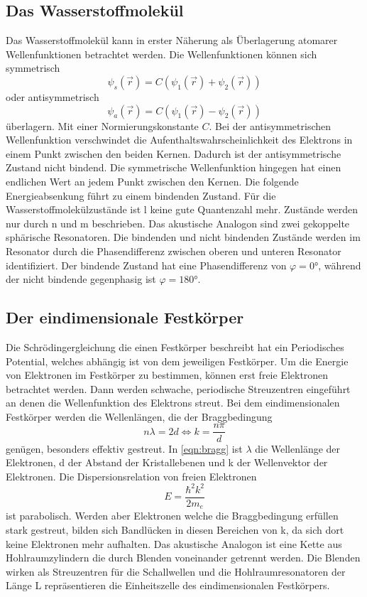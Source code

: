 \subsection{Das Wasserstoffmolekül}
Das Wasserstoffmolekül kann in erster Näherung als Überlagerung atomarer Wellenfunktionen betrachtet werden.
Die Wellenfunktionen können sich symmetrisch
\begin{equation}
    \psi_s(\vec{r}) = C(\psi_1(\vec{r})+\psi_2(\vec{r}))
\end{equation}
oder antisymmetrisch
\begin{equation}
    \psi_a(\vec{r}) = C(\psi_1(\vec{r})-\psi_2(\vec{r}))
\end{equation}
überlagern. Mit einer Normierungskonstante $C$. Bei der antisymmetrischen Wellenfunktion verschwindet die Aufenthaltswahrscheinlichkeit des Elektrons
in einem Punkt zwischen den beiden Kernen. Dadurch ist der antisymmetrische Zustand nicht bindend. 
Die symmetrische Wellenfunktion hingegen hat einen endlichen Wert an jedem Punkt zwischen den Kernen. Die folgende Energieabsenkung führt zu einem bindenden Zustand.
Für die Wasserstoffmolekülzustände ist l keine gute Quantenzahl mehr. Zustände werden nur durch n und m beschrieben.
Das akustische Analogon sind zwei gekoppelte sphärische Resonatoren. Die bindenden und nicht bindenden Zustände werden im Resonator durch die Phasendifferenz zwischen
oberen und unteren Resonator identifiziert. Der bindende Zustand hat eine Phasendifferenz von $\varphi = \ang{0;;}$, während der nicht bindende gegenphasig ist $\varphi = \ang{180;;}$.

\subsection{Der eindimensionale Festkörper}
Die Schrödingergleichung die einen Festkörper beschreibt hat ein Periodisches Potential, welches abhängig ist von dem jeweiligen Festkörper.
Um die Energie von Elektronen im Festkörper zu bestimmen, können erst freie Elektronen betrachtet werden. Dann werden schwache, periodische Streuzentren
eingeführt an denen die Wellenfunktion des Elektrons streut. 
Bei dem eindimensionalen Festkörper werden die Wellenlängen, die der Braggbedingung 
\begin{equation}
    n \lambda = 2 d \iff k = \frac{n \pi}{d}
    \label{eqn:bragg}
\end{equation}
genügen, besonders effektiv gestreut. In \ref{eqn:bragg} ist $\lambda$ die Wellenlänge der Elektronen, d der Abstand der Kristallebenen und k der Wellenvektor der Elektronen.
Die Dispersionsrelation von freien Elektronen
\begin{equation}
    E = \frac{\hbar^2 k^2}{2 m_e}
\end{equation}
ist parabolisch. Werden aber Elektronen welche die Braggbedingung erfüllen stark gestreut, bilden sich Bandlücken in diesen Bereichen von k, da sich
dort keine Elektronen mehr aufhalten. 
Das akustische Analogon ist eine Kette aus Hohlraumzylindern die durch Blenden voneinander getrennt werden. Die Blenden wirken als Streuzentren für 
die Schallwellen und die Hohlraumresonatoren der Länge L repräsentieren die Einheitszelle des eindimensionalen Festkörpers.


